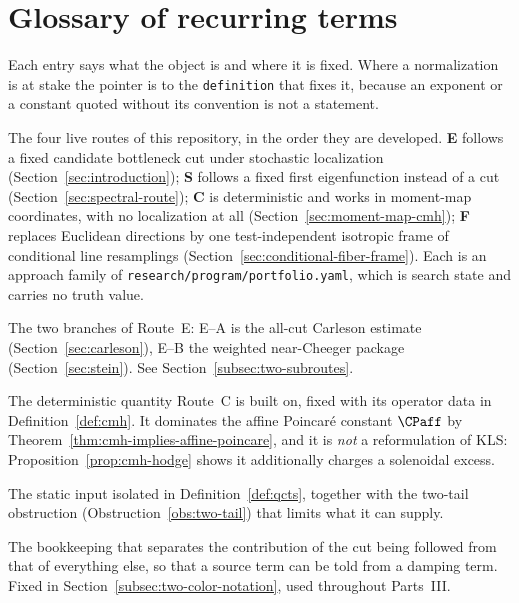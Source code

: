 \documentclass[../../main.tex]{subfiles}
\begin{document}
\section{Glossary of recurring terms}
\label{sec:glossary}

Each entry says what the object is and where it is fixed. Where a normalization is at stake
the pointer is to the \texttt{definition} that fixes it, because an exponent or a constant
quoted without its convention is not a statement.

\begin{description}[leftmargin=0pt,style=nextline,itemsep=0.35em]
  \item[Routes E, S, C, F.] The four live routes of this repository, in the order they are
  developed. \textbf{E} follows a fixed candidate bottleneck cut under stochastic
  localization (Section~\ref{sec:introduction}); \textbf{S} follows a fixed first
  eigenfunction instead of a cut (Section~\ref{sec:spectral-route}); \textbf{C} is
  deterministic and works in moment-map coordinates, with no localization at all
  (Section~\ref{sec:moment-map-cmh}); \textbf{F} replaces Euclidean directions by one
  test-independent isotropic frame of conditional line resamplings
  (Section~\ref{sec:conditional-fiber-frame}). Each is an approach family of
  \texttt{research/program/portfolio.yaml}, which is search state and carries no truth
  value.

  \item[Subroutes E--A and E--B.] The two branches of Route~E: E--A is the all-cut Carleson
  estimate (Section~\ref{sec:carleson}), E--B the weighted near-Cheeger package
  (Section~\ref{sec:stein}). See Section~\ref{subsec:two-subroutes}.

  \item[CMH --- the canonical moment-Hessian constant $\CMH$.] The deterministic quantity
  Route~C is built on, fixed with its operator data in Definition~\ref{def:cmh}. It
  dominates the affine Poincar\'e constant $\CPaff$ by
  Theorem~\ref{thm:cmh-implies-affine-poincare}, and it is \emph{not} a reformulation of
  KLS: Proposition~\ref{prop:cmh-hodge} shows it additionally charges a solenoidal excess.

  \item[QCTS --- the quadratic-chaos two-tail statement.] The static input isolated in
  Definition~\ref{def:qcts}, together with the two-tail obstruction
  (Obstruction~\ref{obs:two-tail}) that limits what it can supply.

  \item[Two-colour covariance and two-colour notation.] The bookkeeping that separates the
  contribution of the cut being followed from that of everything else, so that a source term
  can be told from a damping term. Fixed in Section~\ref{subsec:two-color-notation}, used
  throughout Parts~III.


\end{description}
\end{document}
